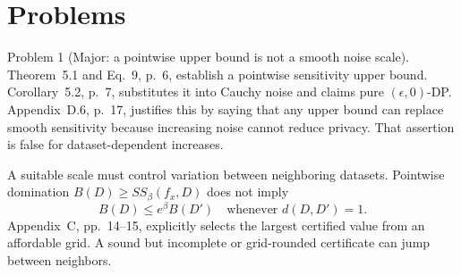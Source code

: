 \documentclass[10pt]{article}
\begin{document}
\section*{Problems}
Problem 1 (Major: a pointwise upper bound is not a smooth noise scale).  Theorem 5.1 and Eq. 9, p. 6, establish a pointwise sensitivity upper bound. Corollary 5.2, p. 7, substitutes it into Cauchy noise and claims pure \((\epsilon,0)\)-DP. Appendix D.6, p. 17, justifies this by saying that any upper bound can replace smooth sensitivity because increasing noise cannot reduce privacy. That assertion is false for dataset-dependent increases.\par
A suitable scale must control variation between neighboring datasets. Pointwise domination \(B(D)\ge SS_\beta(f_x,D)\) does not imply \[B(D)\le e^\beta B(D')\quad\text{whenever }d(D,D')=1.\] Appendix C, pp. 14–15, explicitly selects the largest certified value from an affordable grid. A sound but incomplete or grid-rounded certificate can jump between neighbors.\par
\end{document}
